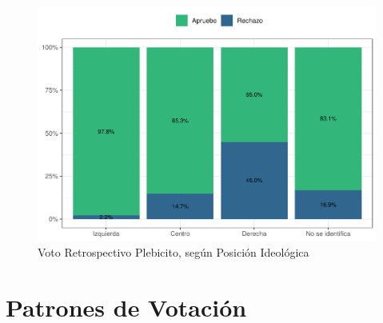 \documentclass[
  12pt,
]{book}
\begin{document}
\begin{figure}

{\centering \includegraphics{reporte-elsoc_files/figure-latex/id-pol-voto-1} 

}

\caption{Voto Retrospectivo Plebicito, según Posición Ideológica}\label{fig:id-pol-voto}
\end{figure}

\hypertarget{patrones-de-votaciuxf3n}{%
\section{Patrones de Votación}\label{patrones-de-votaciuxf3n}}
\end{document}
